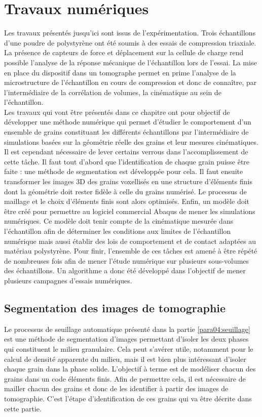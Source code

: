 \graphicspath{{./05-Numerique/images/}}

\chapter{Travaux numériques}
\label{chap:numerique}

Les travaux présentés jusqu'ici sont issus de l'expérimentation. Trois échantillons d'une poudre de polystyrène ont été soumis à des essais de compression triaxiale. La présence de capteurs de force et déplacement sur la cellule de charge rend possible l'analyse de la réponse mécanique de l'échantillon lors de l'essai. La mise en place du dispositif dans un tomographe permet en prime l'analyse de la microstructure de l'échantillon en cours de compression et donc de connaître, par l'intermédiaire de la corrélation de volumes, la cinématique au sein de l'échantillon.
\\Les travaux qui vont être présentés dans ce chapitre ont pour objectif de développer une méthode numérique qui permet d'étudier le comportement d'un ensemble de grains constituant les différents échantillons par l'intermédiaire de simulations basées sur la géométrie réelle des grains et leur mesures cinématiques.
\\Il est cependant nécessaire de lever certains verrous dans l'accomplissement de cette tâche. Il faut tout d'abord que l'identification de chaque grain puisse être faite : une méthode de segmentation est développée pour cela. Il faut ensuite transformer les images 3D des grains voxellisés en une structure d'éléments finis dont la géométrie doit rester fidèle à celle du grains numérisé. Le processus de maillage et le choix d'éléments finis sont alors optimisés. Enfin, un modèle doit être créé pour permettre au logiciel commercial Abaqus \citep{abaqus2016} de mener les simulations numériques. Ce modèle doit tenir compte de la cinématique mesurée dans l'échantillon afin de déterminer les conditions aux limites de l'échantillon numérique mais aussi établir des lois de comportement et de contact adaptées au matériau polystyrène. Pour finir, l'ensemble de ces tâches est amené à être répété de nombreuses fois afin de mener l'étude numérique sur plusieurs sous-volumes des échantillons. Un algorithme a donc été développé dans l'objectif de mener plusieurs campagnes d'essais numériques.

\section{Segmentation des images de tomographie}\label{para05:segmentation}
	Le processus de seuillage automatique présenté dans la partie \ref{para04:seuillage} est une méthode de segmentation d'images permettant d'isoler les deux phases qui constituent le milieu granulaire. Cela peut s'avérer utile, notamment pour le calcul de densité apparente du milieu, mais il est bien plus intéressant d'isoler chaque grain dans la phase solide. L'objectif à terme est de modéliser chacun des grains dans un code éléments finis. Afin de permettre cela, il est nécessaire de mailler chacun des grains et donc de les identifier à partir des images de tomographie. C'est l'étape d'identification de ces grains qui va être décrite dans cette partie.
